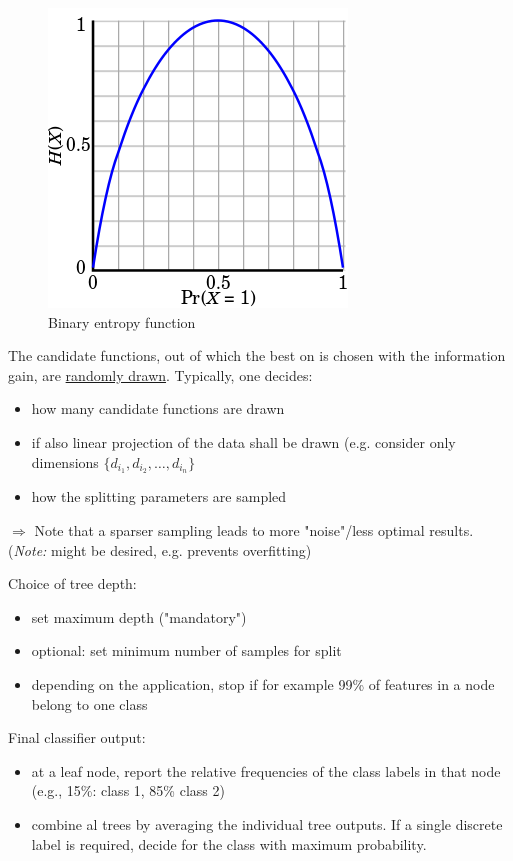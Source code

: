 \documentclass{scrartcl}
\begin{document}
\begin{figure}[ht]
	\centering
    \includegraphics[scale=0.5]{img/entropy.png}
	\caption{Binary entropy function}
	\label{fig:entropy}
\end{figure}

The candidate functions, out of which the best on is chosen with the information gain, are \underline{randomly drawn}. Typically, one decides:
\begin{itemize}
    \item
        how many candidate functions are drawn
    \item
        if also linear projection of the data shall be drawn (e.g. consider only dimensions \(\{d_{i_1}, d_{i_2}, \dots, d_{i_n}\}\)
    \item
        how the splitting parameters are sampled
\end{itemize}
\(\Rightarrow\) Note that a sparser sampling leads to more "noise"/less optimal results. (\textit{Note:} might be desired, e.g. prevents overfitting)

Choice of tree depth:
\begin{itemize}
    \item
        set maximum depth ("mandatory")
    \item
        optional: set minimum number of samples for split 
    \item
        depending on the application, stop if for example 99\% of features in a node belong to one class
\end{itemize}

Final classifier output:
\begin{itemize}
    \item
        at a leaf node, report the relative frequencies of the class labels in that node (e.g., 15\%: class 1, 85\% class 2)
    \item
        combine al trees by averaging the individual tree outputs. If a single discrete label is required, decide for the class with maximum probability.
\end{itemize}
\end{document}
